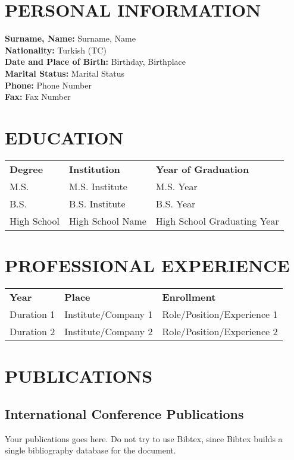 \curriculumvitae
\label{chp:vita}

\section*{\uppercase{Personal Information}}

\textbf{Surname, Name: } Surname, Name\\
\textbf{Nationality:} Turkish (TC) \\
\textbf{Date and Place of Birth:} Birthday, Birthplace\\
\textbf{Marital Status:} Marital Status \\
\textbf{Phone:} Phone Number \\
\textbf{Fax:} Fax Number \\

\section*{\uppercase{Education}}

\begin{tabular}{lll}
	\textbf{Degree} & \textbf{Institution} & \textbf{Year of Graduation} \\
	M.S. & M.S. Institute & M.S. Year \\
	B.S. & B.S. Institute & B.S. Year \\
	High School & High School Name & High School Graduating Year
\end{tabular}

\section*{\uppercase{Professional Experience}}

\begin{tabular}{lll}
	\textbf{Year} & \textbf{Place} & \textbf{Enrollment} \\
	Duration 1 & Institute/Company 1 & Role/Position/Experience 1 \\
	Duration 2 & Institute/Company 2 & Role/Position/Experience 2 
\end{tabular}

\section*{\uppercase{Publications}}
\subsection*{International Conference Publications}
Your publications goes here. Do not try to use Bibtex, since Bibtex builds a single bibliography
database for the document.